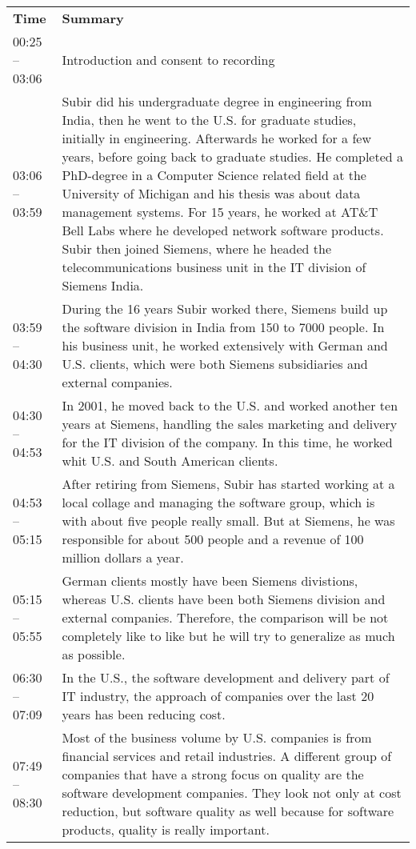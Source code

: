 \begin{appendix}
\begin{longtable}{l p{12.5cm}}
	\textbf{Time} & \textbf{Summary} \\ 
	00:25 -- 03:06&Introduction and consent to recording\\
	03:06 -- 03:59&Subir did his undergraduate degree in engineering from India, then he went to the U.S. for graduate studies, initially in engineering. Afterwards he worked for a few years, before going back to graduate studies. He completed a PhD-degree in a Computer Science related field at the University of Michigan and his thesis was about data management systems. For 15 years, he worked at AT\&T Bell Labs where he developed network software products. Subir then joined Siemens, where he headed the telecommunications business unit in the IT division of Siemens India.\\
	03:59 -- 04:30&During the 16 years Subir worked there, Siemens build up the software division in India from 150 to 7000 people. In his business unit, he worked extensively with German and U.S. clients, which were both Siemens subsidiaries and external companies.\\
	04:30 -- 04:53&In 2001, he moved back to the U.S. and worked another ten years at Siemens, handling the sales marketing and delivery for the IT division of the company. In this time, he worked whit U.S. and South American clients.\\
	04:53 -- 05:15&After retiring from Siemens, Subir has started working at a local collage and managing the software group, which is with about five people really small. But at Siemens, he was responsible for about 500 people and a revenue of 100 million dollars a year.\\
	05:15 -- 05:55&German clients mostly have been Siemens divistions, whereas U.S. clients have been both Siemens division and external companies. Therefore, the comparison will be not completely like to like but he will try to generalize as much as possible.\\
	06:30 -- 07:09& In the U.S., the software development and delivery part of IT industry, the approach of companies over the last 20 years has been reducing cost.\\
	07:49 -- 08:30&Most of the business volume by U.S. companies is from financial services and retail industries. A different group of companies that have a strong focus on quality are the software development companies. They look not only at cost reduction, but software quality as well because for software products, quality is really important.\\

\end{longtable}
\end{appendix}
